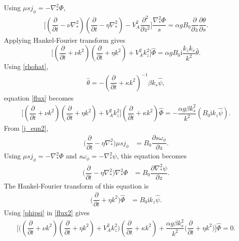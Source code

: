 \documentclass[12pt,psfig]{article}
\begin{document}
Using $\mu s j_\phi=-\nabla^2_*\Phi$, 
\begin{align*}
\Biggl[\left(\dfrac{\partial}{\partial t}-\nu\nabla^2_*\right)\left(\dfrac{\partial}{\partial t}-\eta\nabla^2_*\right)-V_A^2\dfrac{\partial^2}{\partial z^2}\Biggr]\dfrac{\nabla^2_*\Phi}{s}=\alpha g B_0 \dfrac{\partial }{\partial z}\dfrac{\partial \theta}{\partial s}.
\end{align*}
Applying Hankel-Fourier transform gives
\begin{equation}
\Biggl[\left(\dfrac{\partial}{\partial t}+\nu k^2\right)\left(\dfrac{\partial}{\partial t}+\eta k^2\right)+V_A^2k_z^2\Biggr]\hat{\Phi}=\alpha g B_0 \mathrm{i}\dfrac{k_zk_s}{k^2}\hat{\theta}. \label{flux}
\end{equation}
Using \eqref{rhohat},
\begin{align*}
\hat{\theta}=-\left(\dfrac{\partial}{\partial t}+\kappa k^2\right)^{-1}\beta k_s \hat{\psi},
\end{align*}
equation \eqref{flux} becomes
\begin{align}
\Biggl[\left(\dfrac{\partial}{\partial t}+\nu k^2\right)\left(\dfrac{\partial}{\partial t}+\eta k^2\right)+V_A^2k_z^2\Biggr]\left(\dfrac{\partial}{\partial t}+\kappa k^2\right)\hat{\Phi}=- \dfrac{\alpha g\beta k_s^2}{k^2}\left(B_0 \mathrm{i} k_z\hat{\psi}\right). \label{flux2}
\end{align}
From \eqref{j_eqn2},
\begin{align*}
\Biggl(\dfrac{\partial }{\partial t}-\eta\nabla^2_*\Biggr)\mu sj_\phi&=B_0\dfrac{\partial s\omega_\phi}{\partial z}.
\end{align*}
Using $\mu s j_\phi=-\nabla^2_*\Phi$ and $s\omega_\phi=-\nabla^2_*\psi$, this equation becomes
\begin{align*}
\Biggl(\dfrac{\partial }{\partial t}-\eta\nabla^2_*\Biggr)\nabla^2_*\Phi&=B_0\dfrac{\partial \nabla^2_*\psi}{\partial z}.
\end{align*}
The Hankel-Fourier transform of this equation is
\begin{align}
\Biggl(\dfrac{\partial }{\partial t}+\eta k^2\Biggr)\hat{\Phi}&=B_0\mathrm{i}k_z\hat{\psi}. \label{phipsi}
\end{align}
Using \eqref{phipsi} in \eqref{flux2} gives
\begin{align}
\Biggl[\Biggl(\left(\dfrac{\partial}{\partial t}+\nu k^2\right)\left(\dfrac{\partial}{\partial t}+\eta k^2\right)+V_A^2k_z^2\Biggr)\left(\dfrac{\partial}{\partial t}+\kappa k^2\right)+ \dfrac{\alpha g\beta k_s^2}{k^2}\Biggl(\dfrac{\partial }{\partial t}+\eta k^2\Biggr)\Biggr]\hat{\Phi}=0. \label{flux3}
\end{align}
\end{document}
